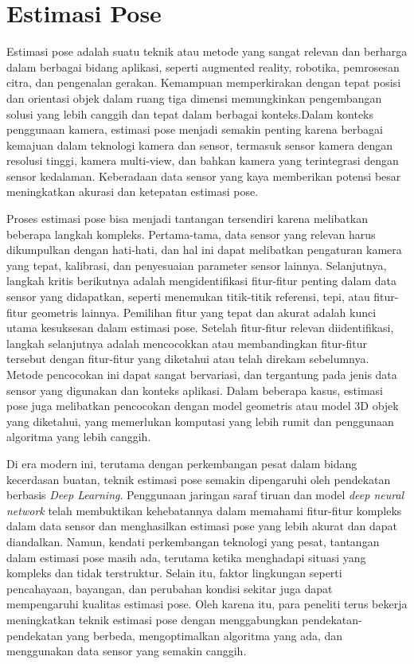 \section{Estimasi Pose}
Estimasi pose adalah suatu teknik atau metode yang sangat relevan dan berharga dalam berbagai bidang aplikasi, seperti augmented reality, robotika, pemrosesan citra, dan pengenalan gerakan. Kemampuan memperkirakan dengan tepat posisi dan orientasi objek dalam ruang tiga dimensi memungkinkan pengembangan solusi yang lebih canggih dan tepat dalam berbagai konteks.Dalam konteks penggunaan kamera, estimasi pose menjadi semakin penting karena berbagai kemajuan dalam teknologi kamera dan sensor, termasuk sensor kamera dengan resolusi tinggi, kamera multi-view, dan bahkan kamera yang terintegrasi dengan sensor kedalaman. Keberadaan data sensor yang kaya memberikan potensi besar  meningkatkan akurasi dan ketepatan estimasi pose.

Proses estimasi pose bisa menjadi tantangan tersendiri karena melibatkan beberapa langkah kompleks. Pertama-tama, data sensor yang relevan harus dikumpulkan dengan hati-hati, dan hal ini dapat melibatkan pengaturan kamera yang tepat, kalibrasi, dan penyesuaian parameter sensor lainnya. Selanjutnya, langkah kritis berikutnya adalah mengidentifikasi fitur-fitur penting dalam data sensor yang didapatkan, seperti menemukan titik-titik referensi, tepi, atau fitur-fitur geometris lainnya. Pemilihan fitur yang tepat dan akurat adalah kunci utama kesuksesan dalam estimasi pose. Setelah fitur-fitur relevan diidentifikasi, langkah selanjutnya adalah mencocokkan atau membandingkan fitur-fitur tersebut dengan fitur-fitur yang diketahui atau telah direkam sebelumnya. Metode pencocokan ini dapat sangat bervariasi, dan tergantung pada jenis data sensor yang digunakan dan konteks aplikasi. Dalam beberapa kasus, estimasi pose juga melibatkan pencocokan dengan model geometris atau model 3D objek yang diketahui, yang memerlukan komputasi yang lebih rumit dan penggunaan algoritma yang lebih canggih.  \cite{Andriluka_2014_CVPR}

Di era modern ini, terutama dengan perkembangan pesat dalam bidang kecerdasan buatan, teknik estimasi pose semakin dipengaruhi oleh pendekatan berbasis \textit{Deep Learning}. Penggunaan jaringan saraf tiruan dan model \textit{deep neural network} telah membuktikan kehebatannya dalam memahami fitur-fitur kompleks dalam data sensor dan menghasilkan estimasi pose yang lebih akurat dan dapat diandalkan. Namun, kendati perkembangan teknologi yang pesat, tantangan dalam estimasi pose masih ada, terutama ketika menghadapi situasi yang kompleks dan tidak terstruktur. Selain itu, faktor lingkungan seperti pencahayaan, bayangan, dan perubahan kondisi sekitar juga dapat mempengaruhi kualitas estimasi pose. Oleh karena itu, para peneliti terus bekerja meningkatkan teknik estimasi pose dengan menggabungkan pendekatan-pendekatan yang berbeda, mengoptimalkan algoritma yang ada, dan menggunakan data sensor yang semakin canggih.

